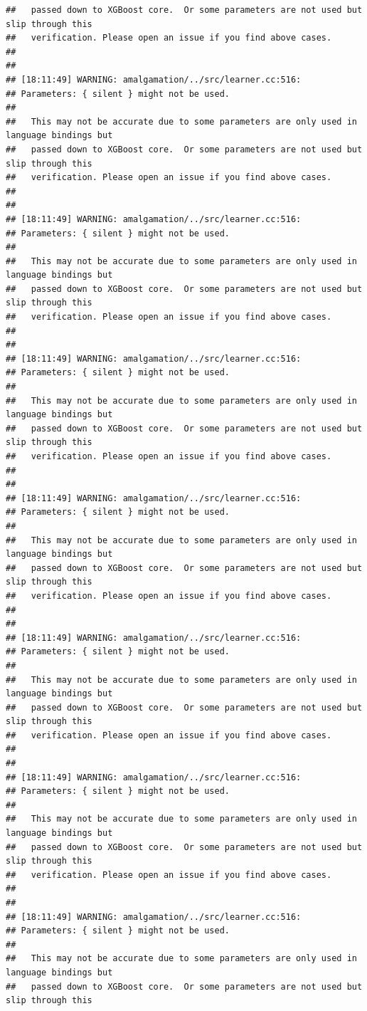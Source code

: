 \documentclass[AMS,STIX2COL]{WileyNJD-v2}\usepackage[]{graphicx}\usepackage[]{color}
\makeatletter
\newenvironment{kframe}{%
 \def\at@end@of@kframe{}%
 \ifinner\ifhmode%
  \def\at@end@of@kframe{\end{minipage}}%
  \begin{minipage}{\columnwidth}%
 \fi\fi%
 \def\FrameCommand##1{\hskip\@totalleftmargin \hskip-\fboxsep
 \colorbox{shadecolor}{##1}\hskip-\fboxsep
     \hskip-\linewidth \hskip-\@totalleftmargin \hskip\columnwidth}%
 \MakeFramed {\advance\hsize-\width
   \@totalleftmargin\z@ \linewidth\hsize
   \@setminipage}}%
 {\par\unskip\endMakeFramed%
 \at@end@of@kframe}
\newenvironment{knitrout}{}{} %
\makeatother
\begin{document}
\begin{knitrout}
\begin{kframe}
\begin{verbatim}
##   passed down to XGBoost core.  Or some parameters are not used but slip through this
##   verification. Please open an issue if you find above cases.
## 
## 
## [18:11:49] WARNING: amalgamation/../src/learner.cc:516: 
## Parameters: { silent } might not be used.
## 
##   This may not be accurate due to some parameters are only used in language bindings but
##   passed down to XGBoost core.  Or some parameters are not used but slip through this
##   verification. Please open an issue if you find above cases.
## 
## 
## [18:11:49] WARNING: amalgamation/../src/learner.cc:516: 
## Parameters: { silent } might not be used.
## 
##   This may not be accurate due to some parameters are only used in language bindings but
##   passed down to XGBoost core.  Or some parameters are not used but slip through this
##   verification. Please open an issue if you find above cases.
## 
## 
## [18:11:49] WARNING: amalgamation/../src/learner.cc:516: 
## Parameters: { silent } might not be used.
## 
##   This may not be accurate due to some parameters are only used in language bindings but
##   passed down to XGBoost core.  Or some parameters are not used but slip through this
##   verification. Please open an issue if you find above cases.
## 
## 
## [18:11:49] WARNING: amalgamation/../src/learner.cc:516: 
## Parameters: { silent } might not be used.
## 
##   This may not be accurate due to some parameters are only used in language bindings but
##   passed down to XGBoost core.  Or some parameters are not used but slip through this
##   verification. Please open an issue if you find above cases.
## 
## 
## [18:11:49] WARNING: amalgamation/../src/learner.cc:516: 
## Parameters: { silent } might not be used.
## 
##   This may not be accurate due to some parameters are only used in language bindings but
##   passed down to XGBoost core.  Or some parameters are not used but slip through this
##   verification. Please open an issue if you find above cases.
## 
## 
## [18:11:49] WARNING: amalgamation/../src/learner.cc:516: 
## Parameters: { silent } might not be used.
## 
##   This may not be accurate due to some parameters are only used in language bindings but
##   passed down to XGBoost core.  Or some parameters are not used but slip through this
##   verification. Please open an issue if you find above cases.
## 
## 
## [18:11:49] WARNING: amalgamation/../src/learner.cc:516: 
## Parameters: { silent } might not be used.
## 
##   This may not be accurate due to some parameters are only used in language bindings but
##   passed down to XGBoost core.  Or some parameters are not used but slip through this

\end{verbatim}
\end{kframe}
\end{knitrout}
\end{document}
